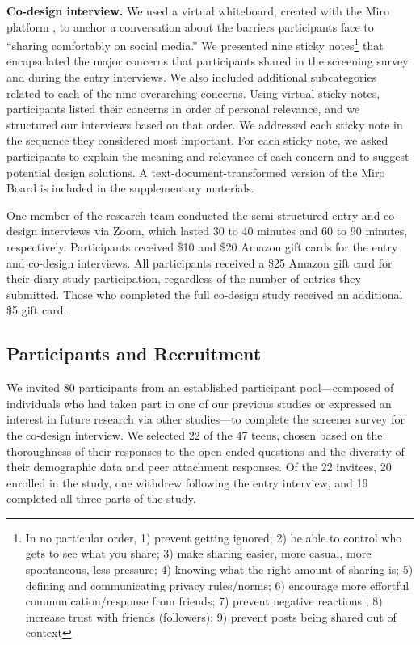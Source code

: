 \vspace{2mm}
\noindent\textbf{Co-design interview.} We used a virtual whiteboard, created with the Miro platform \cite{miro}, to anchor a conversation about the barriers participants face to ``sharing comfortably on social media.'' We presented nine sticky notes\footnote{In no particular order, 1) prevent getting ignored; 2) be able to control who gets to see what you share; 3) make sharing easier, more casual, more spontaneous, less pressure; 4) knowing what the right amount of sharing is; 5) defining and communicating privacy rules/norms; 6) encourage more effortful communication/response from friends; 7) prevent negative reactions ; 8) increase trust with friends (followers); 9) prevent posts being shared out of context} that encapsulated the major concerns that participants shared in the screening survey and during the entry interviews. We also included additional subcategories related to each of the nine overarching concerns. Using virtual sticky notes, participants listed their concerns in order of personal relevance, and we structured our interviews based on that order. We addressed each sticky note in the sequence they considered most important. For each sticky note, we asked participants to explain the meaning and relevance of each concern and to suggest potential design solutions. A text-document-transformed version of the Miro Board is included in the supplementary materials. 

One member of the research team conducted the semi-structured entry and co-design interviews via Zoom, which lasted 30 to 40 minutes and 60 to 90 minutes, respectively. Participants received \$10 and \$20 Amazon gift cards for the entry and co-design interviews. All participants received a \$25 Amazon gift card for their diary study participation, regardless of the number of entries they submitted. Those who completed the full co-design study received an additional \$5 gift card.

%

\subsection{Participants and Recruitment}
We invited 80 participants from an established participant pool---composed of individuals who had taken part in one of our previous studies or expressed an interest in future research via other studies---to complete the screener survey for the co-design interview. We selected 22 of the 47 teens, chosen based on the thoroughness of their responses to the open-ended questions and the diversity of their demographic data and peer attachment responses. Of the 22 invitees, 20 enrolled in the study, one withdrew following the entry interview, and 19 completed all three parts of the study.


